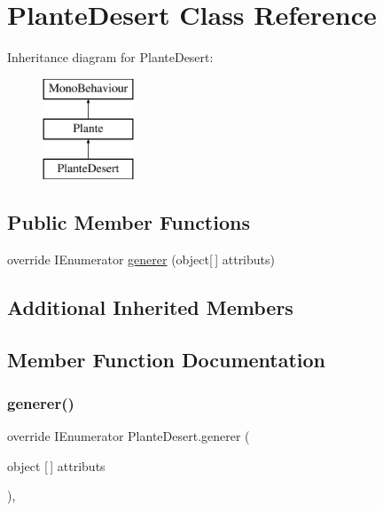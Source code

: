 \hypertarget{class_plante_desert}{}\section{Plante\+Desert Class Reference}
\label{class_plante_desert}
Inheritance diagram for Plante\+Desert\+:\begin{figure}[H]
\begin{center}
\leavevmode
\includegraphics[height=3.000000cm]{class_plante_desert}
\end{center}
\end{figure}
\subsection*{Public Member Functions}
\begin{DoxyCompactItemize}
\item 
override I\+Enumerator \mbox{\hyperlink{class_plante_desert_a2808030edc2d59ca22c4311db64e2a7c}{generer}} (object\mbox{[}$\,$\mbox{]} attributs)
\end{DoxyCompactItemize}
\subsection*{Additional Inherited Members}


\subsection{Member Function Documentation}
\mbox{\label{class_plante_desert_a2808030edc2d59ca22c4311db64e2a7c}} 
\subsubsection{\texorpdfstring{generer()}{generer()}}
{\footnotesize\ttfamily override I\+Enumerator Plante\+Desert.\+generer (\begin{DoxyParamCaption}\item[{object \mbox{[}$\,$\mbox{]}}]{attributs }\end{DoxyParamCaption})\hspace{0.3cm}{\ttfamily [inline]}, {\ttfamily [virtual]}}

